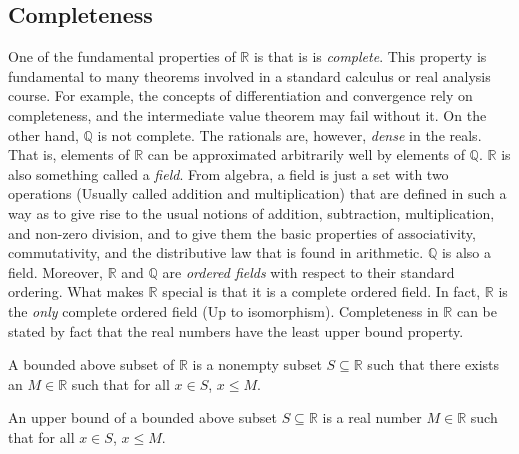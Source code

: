 \documentclass[crop=false,class=book,oneside]{standalone}
\begin{document}
        \subsection{Completeness}
            One of the fundamental properties of $\mathbb{R}$ is
            that is is \textit{complete}. This property is
            fundamental to many theorems involved in a
            standard calculus or real analysis course. For
            example, the concepts of differentiation and
            convergence rely on completeness, and the
            intermediate value theorem may fail without it.
            On the other hand, $\mathbb{Q}$ is not complete. The
            rationals are, however, \textit{dense} in the reals.
            That is, elements of $\mathbb{R}$ can be
            approximated arbitrarily well by elements of
            $\mathbb{Q}$. $\mathbb{R}$ is also something
            called a \textit{field}. From algebra,
            a field is just a set with two operations
            (Usually called addition and multiplication)
            that are defined in such a way as to give rise
            to the usual notions of addition, subtraction,
            multiplication, and non-zero division,
            and to give them the basic properties of
            associativity, commutativity,
            and the distributive law that is found in
            arithmetic. $\mathbb{Q}$ is also a field.
            Moreover, $\mathbb{R}$ and $\mathbb{Q}$ are
            \textit{ordered fields} with respect to
            their standard ordering. What makes
            $\mathbb{R}$ special is that it is a
            complete ordered field. In fact, $\mathbb{R}$
            is the \textit{only} complete ordered field
            (Up to isomorphism). Completeness in
            $\mathbb{R}$ can be stated by fact that the real
            numbers have the least upper bound property.
            \begin{definition}
                A bounded above subset of $\mathbb{R}$
                is a nonempty subset $S\subseteq{\mathbb{R}}$
                such that there exists an $M\in\mathbb{R}$
                such that for all $x\in{S}$, $x\leq{M}$.
            \end{definition}
            \begin{definition}
                An upper bound of a bounded above
                subset $S\subseteq\mathbb{R}$ is a real
                number $M\in\mathbb{R}$
                such that for all $x\in{S}$, $x\leq{M}$.
            \end{definition}
\end{document}
